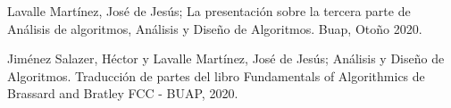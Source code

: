 \documentclass{article}
\theoremstyle{definition}
\theoremstyle{remark}
\begin{document}
\begin{enumerate}[1.]
\end{enumerate}


\clearpage

\pagebreak 
\begin{thebibliography}{99}
 Lavalle Mart\'inez, Jos\'e de Jes\'us; La presentaci\'on sobre la tercera
parte de An\'alisis de algoritmos, An\'alisis y Dise\~{n}o de Algoritmos.
Buap, Oto\~{n}o 2020.

 Jim\'enez Salazer, H\'ector y Lavalle Mart\'inez, Jos\'e de Jes\'us; An\'alisis y Dise\~{n}o de Algoritmos. Traducci\'on de partes del libro Fundamentals of Algorithmics de Brassard and Bratley FCC - BUAP, 2020.





\end{thebibliography}
\end{document}
